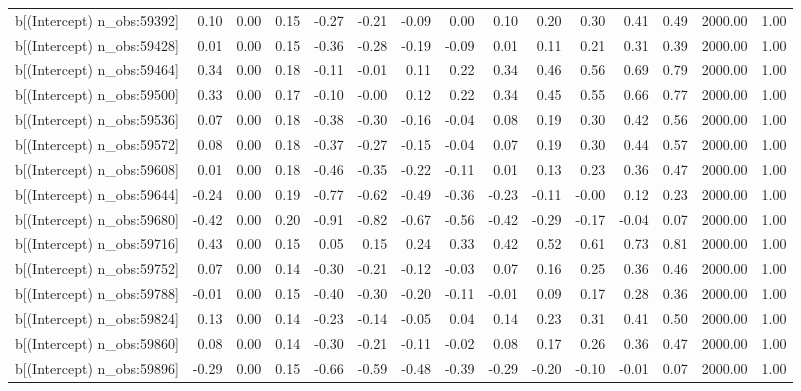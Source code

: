 \begin{table}[ht]
\begin{tabular}{rrrrrrrrrrrrrrr}
  b[(Intercept) n\_obs:59392] & 0.10 & 0.00 & 0.15 & -0.27 & -0.21 & -0.09 & 0.00 & 0.10 & 0.20 & 0.30 & 0.41 & 0.49 & 2000.00 & 1.00 \\ 
  b[(Intercept) n\_obs:59428] & 0.01 & 0.00 & 0.15 & -0.36 & -0.28 & -0.19 & -0.09 & 0.01 & 0.11 & 0.21 & 0.31 & 0.39 & 2000.00 & 1.00 \\ 
  b[(Intercept) n\_obs:59464] & 0.34 & 0.00 & 0.18 & -0.11 & -0.01 & 0.11 & 0.22 & 0.34 & 0.46 & 0.56 & 0.69 & 0.79 & 2000.00 & 1.00 \\ 
  b[(Intercept) n\_obs:59500] & 0.33 & 0.00 & 0.17 & -0.10 & -0.00 & 0.12 & 0.22 & 0.34 & 0.45 & 0.55 & 0.66 & 0.77 & 2000.00 & 1.00 \\ 
  b[(Intercept) n\_obs:59536] & 0.07 & 0.00 & 0.18 & -0.38 & -0.30 & -0.16 & -0.04 & 0.08 & 0.19 & 0.30 & 0.42 & 0.56 & 2000.00 & 1.00 \\ 
  b[(Intercept) n\_obs:59572] & 0.08 & 0.00 & 0.18 & -0.37 & -0.27 & -0.15 & -0.04 & 0.07 & 0.19 & 0.30 & 0.44 & 0.57 & 2000.00 & 1.00 \\ 
  b[(Intercept) n\_obs:59608] & 0.01 & 0.00 & 0.18 & -0.46 & -0.35 & -0.22 & -0.11 & 0.01 & 0.13 & 0.23 & 0.36 & 0.47 & 2000.00 & 1.00 \\ 
  b[(Intercept) n\_obs:59644] & -0.24 & 0.00 & 0.19 & -0.77 & -0.62 & -0.49 & -0.36 & -0.23 & -0.11 & -0.00 & 0.12 & 0.23 & 2000.00 & 1.00 \\ 
  b[(Intercept) n\_obs:59680] & -0.42 & 0.00 & 0.20 & -0.91 & -0.82 & -0.67 & -0.56 & -0.42 & -0.29 & -0.17 & -0.04 & 0.07 & 2000.00 & 1.00 \\ 
  b[(Intercept) n\_obs:59716] & 0.43 & 0.00 & 0.15 & 0.05 & 0.15 & 0.24 & 0.33 & 0.42 & 0.52 & 0.61 & 0.73 & 0.81 & 2000.00 & 1.00 \\ 
  b[(Intercept) n\_obs:59752] & 0.07 & 0.00 & 0.14 & -0.30 & -0.21 & -0.12 & -0.03 & 0.07 & 0.16 & 0.25 & 0.36 & 0.46 & 2000.00 & 1.00 \\ 
  b[(Intercept) n\_obs:59788] & -0.01 & 0.00 & 0.15 & -0.40 & -0.30 & -0.20 & -0.11 & -0.01 & 0.09 & 0.17 & 0.28 & 0.36 & 2000.00 & 1.00 \\ 
  b[(Intercept) n\_obs:59824] & 0.13 & 0.00 & 0.14 & -0.23 & -0.14 & -0.05 & 0.04 & 0.14 & 0.23 & 0.31 & 0.41 & 0.50 & 2000.00 & 1.00 \\ 
  b[(Intercept) n\_obs:59860] & 0.08 & 0.00 & 0.14 & -0.30 & -0.21 & -0.11 & -0.02 & 0.08 & 0.17 & 0.26 & 0.36 & 0.47 & 2000.00 & 1.00 \\ 
  b[(Intercept) n\_obs:59896] & -0.29 & 0.00 & 0.15 & -0.66 & -0.59 & -0.48 & -0.39 & -0.29 & -0.20 & -0.10 & -0.01 & 0.07 & 2000.00 & 1.00 \\ 

\end{tabular}
\end{table}
